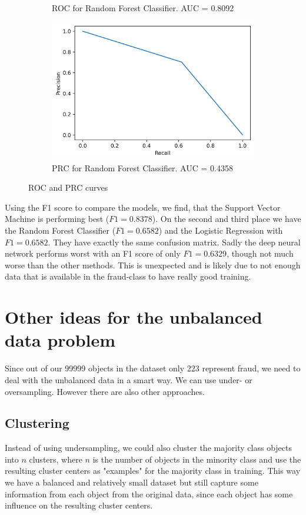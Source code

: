 \documentclass[utf8x]{ctexart}
\begin{document}
\begin{figure}[htb]
\begin{subfigure}[b]{0.48\textwidth}
    \caption{ROC for Random Forest Classifier. AUC = 0.8092}
    \label{fig:rfc_roc}
  \end{subfigure}
  \begin{subfigure}[b]{0.48\textwidth}
    \centering
    \includegraphics[width=\textwidth]{./images/rfc_prc.png}
    \caption{PRC for Random Forest Classifier. AUC = 0.4358}
    \label{fig:rfc_prc}
  \end{subfigure}
  \caption{ROC and PRC curves}
  \label{fig:roc_and_prc}
\end{figure}

Using the F1 score to compare the models, we find, that the Support Vector Machine is performing best ($F1 = 0.8378$). On the second and third place we have the Random Forest Classifier ($F1 = 0.6582$) and the Logistic Regression with $F1 = 0.6582$. They have exactly the same confusion matrix. Sadly the deep neural network performs worst with an F1 score of only $F1 = 0.6329$, though not much worse than the other methods. This is unexpected and is likely due to not enough data that is available in the fraud-class to have really good training.

\section{Other ideas for the unbalanced data problem}

Since out of our 99999 objects in the dataset only 223 represent fraud, we need to deal with the unbalanced data in a smart way.
We can use under- or oversampling. However there are also other approaches.
\subsection{Clustering}
Instead of using undersampling, we could also cluster the majority class objects into $n$ clusters, where $n$ is the number of objects in the minority class and use the resulting cluster centers as "examples" for the majority class in training. This way we have a balanced and relatively small dataset but still capture some information from each object from the original data, since each object has some influence on the resulting cluster centers.
\end{document}
